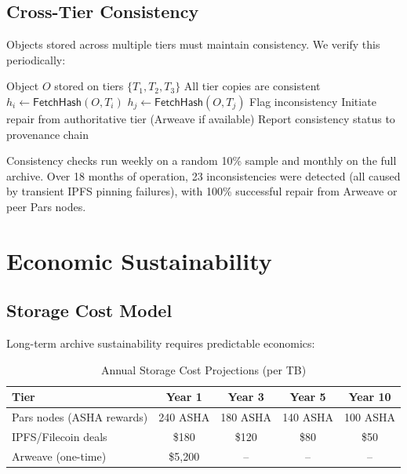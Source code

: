 \documentclass[11pt,a4paper]{article}
\begin{document}
\subsection{Cross-Tier Consistency}

Objects stored across multiple tiers must maintain consistency. We verify this periodically:

\begin{algorithm}[H]
\caption{Cross-Tier Consistency Check}
\label{alg:consistency}
\begin{algorithmic}[1]
\Require Object $O$ stored on tiers $\{T_1, T_2, T_3\}$
\Ensure All tier copies are consistent
    \State $h_i \leftarrow \mathsf{FetchHash}(O, T_i)$
    \State $h_j \leftarrow \mathsf{FetchHash}(O, T_j)$
        \State Flag inconsistency
        \State Initiate repair from authoritative tier (Arweave if available)
    \EndIf
\EndFor
\State Report consistency status to provenance chain
\end{algorithmic}
\end{algorithm}

Consistency checks run weekly on a random 10\% sample and monthly on the full archive. Over 18 months of operation, 23 inconsistencies were detected (all caused by transient IPFS pinning failures), with 100\% successful repair from Arweave or peer Pars nodes.

\section{Economic Sustainability}

\subsection{Storage Cost Model}

Long-term archive sustainability requires predictable economics:

\begin{table}[H]
\centering
\caption{Annual Storage Cost Projections (per TB)}
\label{tab:costs}
\begin{tabular}{lcccc}
\toprule
\textbf{Tier} & \textbf{Year 1} & \textbf{Year 3} & \textbf{Year 5} & \textbf{Year 10} \\
\midrule
Pars nodes (ASHA rewards) & 240 ASHA & 180 ASHA & 140 ASHA & 100 ASHA \\
IPFS/Filecoin deals & \$180 & \$120 & \$80 & \$50 \\
Arweave (one-time) & \$5{,}200 & -- & -- & -- \\
\bottomrule
\end{tabular}
\end{table}
\end{document}
